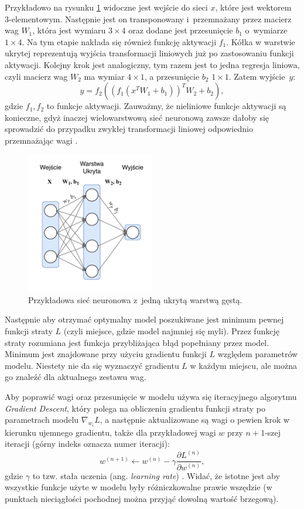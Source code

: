 \documentclass{pracalicmgr}
\begin{document}
	 Przykładowo na rysunku \ref{fig:simple} widoczne jest wejście do sieci $x$, które jest wektorem 3-elementowym. Następnie jest on transponowany i~przemnażany przez macierz wag $W_1$, która jest wymiaru $3\times4$ oraz dodane jest przesunięcie $b_1$ o~wymiarze $1\times4$. Na tym etapie nakłada się również funkcję aktywacji $f_1$. Kółka w warstwie ukrytej reprezentują wyjścia transformacji liniowych już po zastosowaniu funkcji aktywacji. Kolejny krok jest analogiczny, tym razem jest to jedna regresja liniowa, czyli macierz wag $W_2$ ma wymiar $4\times1$, a przesunięcie $b_2$ $1\times1$. Zatem wyjście~$y$: $$y = f_2\left(\left(f_1(x^TW_1 + b_1)\right)^TW_2 + b_2\right),$$ gdzie $f_1, f_2$ to funkcje aktywacji. Zauważmy, że nieliniowe funkcje aktywacji są konieczne, gdyż inaczej wielowarstwową sieć neuronową zawsze dałoby się sprowadzić do przypadku zwykłej transformacji liniowej odpowiednio przemnażając wagi \cite{dl}.
	
	\begin{figure}[H]
	\centering
	\includegraphics[width=0.5\textwidth]{simple_nn.pdf}
	\caption{Przykładowa sieć neuronowa z~jedną ukrytą warstwą gęstą.}
	\label{fig:simple}
	\end{figure}
	
	Następnie aby otrzymać optymalny model poszukiwane jest minimum pewnej funkcji straty $L$ (czyli miejsce, gdzie model najmniej się myli). Przez funkcję straty rozumiana jest funkcja przybliżająca błąd popełniany przez model. Minimum jest znajdowane przy użyciu gradientu funkcji $L$ względem parametrów modelu. Niestety nie da się wyznaczyć gradientu $L$ w każdym miejscu, ale można go znaleźć dla aktualnego zestawu wag. 
	
	Aby poprawić wagi oraz przesunięcie w modelu używa się iteracyjnego algorytmu \textit{Gradient Descent}, który polega na obliczeniu gradientu funkcji straty po parametrach modelu $\nabla_{w_i}L$, a następnie aktualizowane są wagi o pewien krok w kierunku ujemnego gradientu, także dla przykładowej wagi $w$ przy $n+1$-szej iteracji (górny indeks oznacza numer iteracji): $$w^{(n+1)} \leftarrow w^{(n)} - \gamma \frac{\partial L^{(n)}}{\partial w^{(n)}},$$ gdzie $\gamma$ to tzw. stała uczenia (ang. \textit{learning rate}) \cite{dl}. Widać, że istotne jest aby wszystkie funkcje użyte w modelu były różniczkowalne prawie wszędzie (w punktach nieciągłości pochodnej można przyjąć dowolną wartość brzegową). 
	
\end{document}
